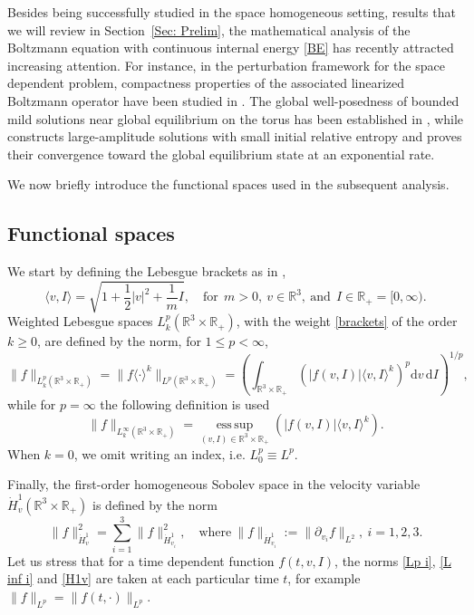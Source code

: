 \documentclass[11pt,a4paper]{amsart}
\newcommand{\bR}{\mathbb{R}^3}
\newcommand{\bRp}{\mathbb{R}_+}
\newcommand{\bRfp}{\mathbb{R}^3 \times \bRp}
\newcommand{\md}{\mathrm{d}}
\newcommand{\la}{\langle}
\newcommand{\ra}{\rangle}
\DeclareMathOperator*{\esssup}{ess \, sup}
\begin{document}
Besides being successfully studied in the space homogeneous setting, results that we will review in Section~\ref{Sec: Prelim}, the mathematical analysis of the Boltzmann equation with continuous internal energy \eqref{BE} has recently attracted increasing attention. For instance, in the perturbation framework for the space dependent problem, compactness properties of the associated linearized Boltzmann operator have been studied in \cite{Bern, Brull, Bern-nous}. The global well-posedness of bounded mild solutions near global equilibrium on the torus has been established in \cite{Duan-Li}, while \cite{Ko-Son} constructs large-amplitude solutions with small initial relative entropy and proves their convergence toward the global equilibrium state at an exponential rate.

 

We now briefly introduce the functional spaces used in the subsequent analysis.

\subsection{Functional spaces}
We start by defining the Lebesgue brackets as in \cite{MPC-IG-poly},
\begin{equation}\label{brackets}
	\la v, I \ra = \sqrt{1 + \frac{1}{2}  |v|^2  + \frac{1}{ m}  I  }, \quad \text{for} \ \ m >0, \ v\in\bR, \ \text{and} \ \ I \in \mathbb{R}_+ = [0,\infty).
\end{equation}
Weighted  Lebesgue spaces  $L^p_{ k}(\bR\times\bRp)$,    with the weight  \eqref{brackets} of the order $k\geq 0$,  are   defined by the norm, for  $1\leq p<\infty$,
 \begin{equation}\label{Lp i}
 	 \| f \|_{L^p_{ k}(\bR\times\bRp)}
 	  =   \| f \la \cdot \ra^{k} \|_{L^p(\bR\times\bRp)} =   \left(  \int_{\bRfp} \left(  |f(v,I)| \la v, I \ra^{k} \right)^p \md v\, \md I  \right)^{1/p},
 \end{equation}
 while for $p=\infty$ the following definition is used
 \begin{equation}\label{L inf i}
  \| f \|_{L^\infty_{ k}(\bR\times\bRp)}  = \esssup\limits_{(v,I) \in \bRfp} \left(  |f(v,I)| \la v, I \ra^{k} \right).
 \end{equation}
When $k=0$, we omit  writing an index, i.e. $L^p_0\equiv L^p$. 

Finally, the first-order homogeneous Sobolev space in the velocity variable $	\dot{H}^{1}_{v}(\bRfp)$ is defined by the norm 
\begin{equation}\label{H1v}
 \| f \|_{\dot{H}^{1}_{ v}}^2   =  	\sum_{i=1}^{3}   \| f \|_{\dot{H}^{1}_{v_i}}^2,  \quad \text{where} \      \| f \|_{\dot{H}^{1}_{v_i}}  := \| \partial_{v_i} f \|_{{L}^{2}}, \ i=1,2,3.
\end{equation}
Let us stress that for a time dependent function $f(t,v,I)$, the norms \eqref{Lp i}, \eqref{L inf i} and \eqref{H1v} are taken at each particular time $t$, for example $\|f\|_{L^p} = \| f(t,\cdot)\|_{L^p}$.  
\end{document}
